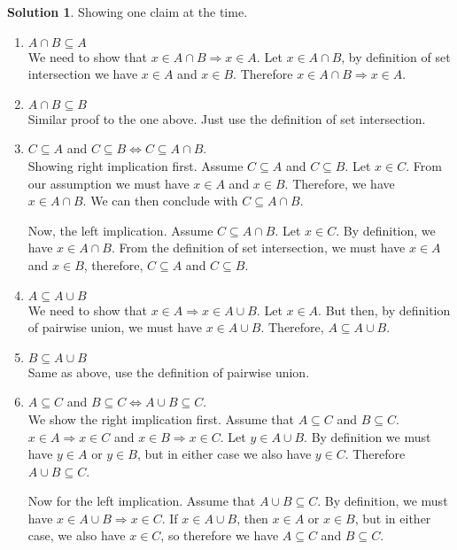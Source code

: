 \documentclass[a4paper, twocolumn]{report}
\theoremstyle{definition}
\theoremstyle{solution}
\newtheorem*{sltn}{Solution}
\newcommand{\union}{\cup}
\newcommand{\intrsct}{\cap}
\begin{document}
\begin{sltn}
  Showing one claim at the time.
  \begin{enumerate}
    \item $A \intrsct B \subseteq A$ \\
      [0.2cm]
      We need to show that $x \in A \intrsct B \Rightarrow x \in A$.  Let $x
      \in A \intrsct B$, by definition of set intersection we have $x \in A$
      and $x \in B$. Therefore $x \in A \intrsct B \Rightarrow x \in A$.

    \item $A \intrsct B \subseteq B$ \\
      [0.2cm]
      Similar proof to the one above. Just use the definition of set
      intersection.
   
    \item $C \subseteq A$ and $ C \subseteq B \Longleftrightarrow C \subseteq A \intrsct B$.\\
      [0.2cm]
      Showing right implication first. Assume $C \subseteq A$ and $C \subseteq
      B$. Let $x \in C$.  From our assumption we must have $x \in A$ and $x \in
      B$. Therefore, we have $x \in A \intrsct B$.  We can then conclude with
      $C \subseteq A \intrsct B$. 

      Now, the left implication. Assume $C \subseteq A \intrsct B$. Let $x \in
      C$.  By definition, we have $x \in A \intrsct B$. From the definition of
      set intersection, we must have $x \in A$ and $x \in B$, therefore, $C
      \subseteq A$ and $C \subseteq B$. 
   
    \item $A \subseteq A \union B$ \\
      [0.2cm]
      We need to show that $x \in A \Rightarrow x \in A \union B$.  Let $x \in
      A$. But then, by definition of pairwise union, we must have $x \in A
      \union B$. Therefore, $A \subseteq A \union B$. 

    \item $B \subseteq A \union B$ \\
      [0.2cm]
      Same as above, use the definition of pairwise union.
    
    
    \item $A \subseteq C$ and $B \subseteq C \Longleftrightarrow A \union B \subseteq C$.\\
      [0.2cm]
      We show the right implication first. Assume that $A \subseteq C$ and $B
      \subseteq C$.  $x \in A \Rightarrow x \in C$ and $x \in B \Rightarrow x
      \in C$. Let $y \in A \union B$.  By definition we must have $y \in A$ or
      $y \in B$, but in either case we also have $y \in C$.  Therefore $A
      \union B \subseteq C$. 

      Now for the left implication. Assume that $A \union B \subseteq C$. By
      definition, we must have $x \in A \union B \Rightarrow x \in C$. If $x
      \in A \union B$, then $x \in A$ or $x \in B$, but in either case, we also
      have $x \in C$, so therefore we have $A \subseteq C$ and $B \subseteq C$.
    
  \end{enumerate}
\end{sltn}
\end{document}
